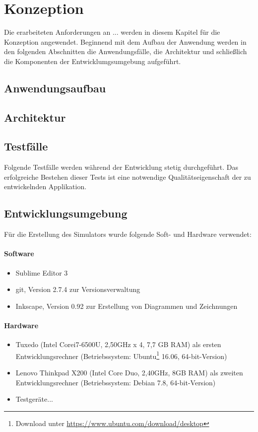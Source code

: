 \chapter{\label{chap:konzeption}Konzeption}
Die erarbeiteten Anforderungen an ... werden in diesem Kapitel für die Konzeption angewendet.
Beginnend mit dem Aufbau der Anwendung werden in den folgenden Abschnitten die Anwendungsfälle,
die Architektur und schließlich die Komponenten der Entwicklumgsumgebung aufgeführt.
%
%
\section{Anwendungsaufbau}
%
%
\section{Architektur}
%
%
\section{Testfälle}
Folgende Testfälle werden während der Entwicklung stetig durchgeführt. Das erfolgreiche Bestehen dieser Tests ist eine notwendige Qualitätseigenschaft der zu entwickelnden Applikation.
%
%
\section{Entwicklungsumgebung}
Für die Erstellung des Simulators wurde folgende Soft- und Hardware verwendet:
\subsubsection{Software}
\begin{itemize}
	\item Sublime Editor 3
	\item git, Version 2.7.4 zur Versionsverwaltung
	\item Inkscape, Version 0.92 zur Erstellung von Diagrammen und Zeichnungen
\end{itemize}
\subsubsection{Hardware}
\begin{itemize}
	\item Tuxedo (Intel\textsuperscript{\textregistered} Core\tm i7-6500U, 2,50GHz x 4, 7,7 GB RAM) als ersten Entwicklungsrechner
	      (Betriebssystem: Ubuntu\footnote{ Download unter \url{https://www.ubuntu.com/download/desktop}} 16.06, 64-bit-Version)
	\item Lenovo Thinkpad X200 (Intel\textsuperscript{\textregistered} Core Duo, 2,40GHz, 8GB RAM) als zweiten Entwicklungsrechner (Betriebssystem: Debian 7.8, 64-bit-Version)
	\item Testgeräte...
\end{itemize}
